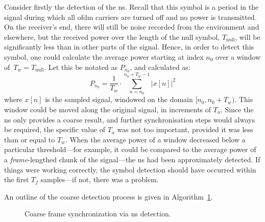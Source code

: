 \documentclass[class=report,11pt,crop=false]{standalone}
\begin{document}
Consider firstly the detection of the \gls{ns}. Recall that this symbol is a period in the signal during which all \gls{ofdm} carriers are turned off and no power is transmitted. On the receiver's end, there will still be noise recorded from the environment and elsewhere, but the received power over the length of the null symbol, \(T_\textrm{null}\), will be significantly less than in other parts of the signal. Hence, in order to detect this symbol, one could calculate the average power starting at index \(n_0\) over a window of~\(T_w = T_\textrm{null}\). Let this be notated as \(P_{n_0}\), and calculated as:
\begin{equation}
  P_{n_0} = \frac{1}{T_w} \cdot \sum^{n_0 + T_w - 1}_{n=n_0} \left| x[n] \right|^2
\end{equation}
where \(x[n]\) is the sampled signal, windowed on the domain \([n_0, n_0 + T_w)\). This window could be moved along the original signal, in increments of \(T_a\). Since the \gls{ns} only provides a coarse result, and further synchronisation steps would always be required, the specific value of \(T_a\) was not too important, provided it was less than or equal to \(T_w\). When the average power of a window decreased below a particular threshold---for example, it could be compared to the average power of a \emph{frame}-lengthed chunk of the signal---the \gls{ns} had been approximately detected. If things were working correctly, the symbol detection should have occurred within the first \(T_f\) samples---if not, there was a problem.

An outline of the coarse detection process is given in Algorithm~\ref{alg:null_symbol_detect}.

\begin{figure}[ht]
  \vspace{0.5cm}
  \centering
  \captionsetup{type=figure}
  \begin{minipage}{.75\linewidth}
    \begin{algorithm}[H]
      \caption{Coarse frame synchronization via \gls{ns} detection.\label{alg:null_symbol_detect}}

      \DontPrintSemicolon
      \SetAlgoLined


      \BlankLine
      \vspace{0.5cm}
    \end{algorithm}
  \end{minipage}
\end{figure}
\end{document}
